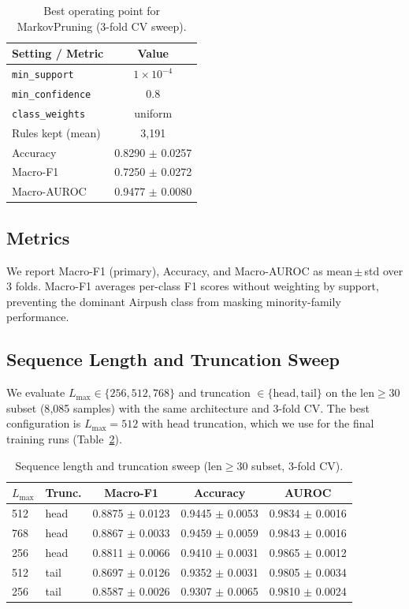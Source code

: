 \documentclass[12pt]{report}
\begin{document}
\begin{table}[t]
\centering
\caption{Best operating point for MarkovPruning (3-fold CV sweep).}
\label{tab:markov_sweep}
\begin{tabular}{lc}
\toprule
\textbf{Setting / Metric} & \textbf{Value} \\
\midrule
\texttt{min\_support} & $1\times 10^{-4}$ \\
\texttt{min\_confidence} & 0.8 \\
\texttt{class\_weights} & uniform \\
Rules kept (mean) & 3{,}191 \\
Accuracy & 0.8290 $\pm$ 0.0257 \\
Macro-F1 & 0.7250 $\pm$ 0.0272 \\
Macro-AUROC & 0.9477 $\pm$ 0.0080 \\
\bottomrule
\end{tabular}
\end{table}

\subsection{Metrics}
We report Macro-F1 (primary), Accuracy, and Macro-AUROC as
mean\,$\pm$\,std over 3 folds. Macro-F1 averages per-class F1 scores
without weighting by support, preventing the dominant Airpush class
from masking minority-family performance.

\subsection{Sequence Length and Truncation Sweep}
We evaluate $L_{\max}\in\{256, 512, 768\}$ and truncation
$\in\{\text{head},\text{tail}\}$ on the len$\geq$30 subset
(8{,}085 samples) with the same architecture and 3-fold CV. The best
configuration is $L_{\max}=512$ with head truncation, which we use for
the final training runs (Table~\ref{tab:seq_len_sweep}).

\begin{table}[t]
\centering
\caption{Sequence length and truncation sweep (len$\geq$30 subset, 3-fold CV).}
\label{tab:seq_len_sweep}
\begin{tabular}{l l c c c}
\toprule
\textbf{$L_{\max}$} & \textbf{Trunc.} & \textbf{Macro-F1} & \textbf{Accuracy} & \textbf{AUROC} \\
\midrule
512 & head & 0.8875 $\pm$ 0.0123 & 0.9445 $\pm$ 0.0053 & 0.9834 $\pm$ 0.0016 \\
768 & head & 0.8867 $\pm$ 0.0033 & 0.9459 $\pm$ 0.0059 & 0.9843 $\pm$ 0.0016 \\
256 & head & 0.8811 $\pm$ 0.0066 & 0.9410 $\pm$ 0.0031 & 0.9865 $\pm$ 0.0012 \\
512 & tail & 0.8697 $\pm$ 0.0126 & 0.9352 $\pm$ 0.0031 & 0.9805 $\pm$ 0.0034 \\
256 & tail & 0.8587 $\pm$ 0.0026 & 0.9307 $\pm$ 0.0065 & 0.9810 $\pm$ 0.0024 \\
\bottomrule
\end{tabular}
\end{table}
\end{document}
